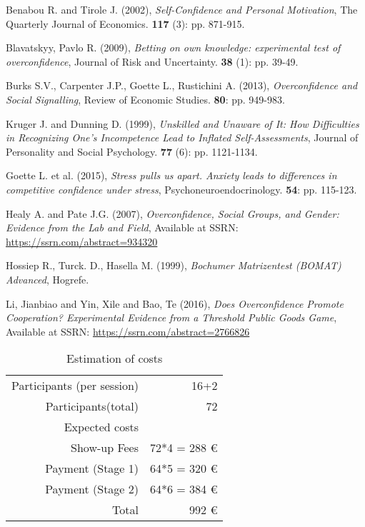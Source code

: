 \documentclass[11pt,twoside,a4paper,leqno]{article}
\begin{document}
\clearpage 
\begin{thebibliography}{9}
\footnotesize

  Benabou R. and Tirole J.
  (2002),
  \emph{Self-Confidence and Personal Motivation},
  The Quarterly Journal of Economics.
  \textbf{117} (3):
  pp. 871-915.

  Blavatskyy, Pavlo R.
  (2009),
  \emph{Betting on own knowledge: experimental test of overconfidence},
  Journal of Risk and Uncertainty.
  \textbf{38} (1):
  pp. 39-49.
  
  Burks S.V., Carpenter J.P., Goette L., Rustichini A.
  (2013),
  \emph{Overconfidence and Social Signalling},
  Review of Economic Studies.
  \textbf{80}:
  pp. 949-983.

%  
  Kruger J. and Dunning D.
  (1999),
  \emph{Unskilled and Unaware of It: How Difficulties in Recognizing One's Incompetence Lead to Inflated Self-Assessments},
  Journal of Personality and Social Psychology.
  \textbf{77} (6):
  pp. 1121-1134.

  Goette L. et al.
  (2015),
  \emph{Stress pulls us apart. Anxiety leads to differences in competitive confidence under stress},
  Psychoneuroendocrinology.
  \textbf{54}:
  pp. 115-123.

  Healy A. and Pate J.G.
  (2007),
  \emph{Overconfidence, Social Groups, and Gender: Evidence from the Lab and Field},
  Available at SSRN: \url{https://ssrn.com/abstract=934320}


  Hossiep R., Turck. D., Hasella M.
  (1999),
  \emph{Bochumer Matrizentest (BOMAT) Advanced},
  Hogrefe.
  
    
  Li, Jianbiao and Yin, Xile and Bao, Te
  (2016),
  \emph{Does Overconfidence Promote Cooperation? Experimental Evidence from a Threshold Public Goods Game},
  Available at SSRN: \url{https://ssrn.com/abstract=2766826}
  

%
%
%  
\end{thebibliography}

\begin{table}[h!]  
	\centering 
    \caption{Estimation of costs}
	\vspace{5mm}
    \begin{tabular}{ r  r }
    Participants (per session) & 16+2 \\ 
    Participants(total) & 72 \\ \hline
    Expected costs & \\ 
    Show-up Fees & 72*4 = 288 \euro \\ 
    Payment (Stage 1) & 64*5 = 320 \euro \\ 
    Payment (Stage 2) & 64*6 = 384 \euro \\ \hline
    Total & 992 \euro \\
    \end{tabular}\\
\end{table}
\end{document}
